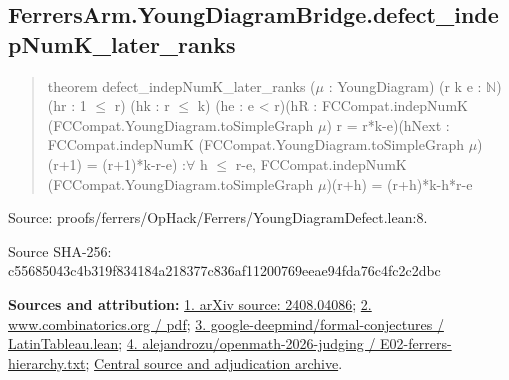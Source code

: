 \documentclass[11pt,a4paper]{article}
\begin{document}
\begin{samepage}
\subsection{FerrersArm.YoungDiagramBridge.defect\_indepNumK\_later\_ranks}
\begin{quote}\small\ttfamily theorem defect\_indepNumK\_later\_ranks (\ensuremath{\mu} : YoungDiagram) (r k e : \ensuremath{\mathbb{N}})\newline     (hr : 1 \ensuremath{\leq} r) (hk : r \ensuremath{\leq} k) (he : e < r)\newline     (hR : FCCompat.indepNumK (FCCompat.YoungDiagram.toSimpleGraph \ensuremath{\mu}) r = r*k-e)\newline     (hNext : FCCompat.indepNumK (FCCompat.YoungDiagram.toSimpleGraph \ensuremath{\mu})\newline       (r+1) = (r+1)*k-r-e) :\newline     \ensuremath{\forall} h \ensuremath{\leq} r-e, FCCompat.indepNumK (FCCompat.YoungDiagram.toSimpleGraph \ensuremath{\mu})\newline       (r+h) = (r+h)*k-h*r-e\end{quote}
{\small Source: proofs/ferrers/OpHack/Ferrers/YoungDiagramDefect.lean:8.\par}

{\small Source SHA-256: c55685043c4b319f834184a218377c836af11200769eeae94fda76c4fc2c2dbc\par}

{\small\textbf{Sources and attribution:} \href{https://arxiv.org/abs/2408.04086}{1. arXiv source: 2408.04086}; \href{https://www.combinatorics.org/ojs/index.php/eljc/article/download/v32i2p48/pdf/}{2. www.combinatorics.org / pdf}; \href{https://github.com/google-deepmind/formal-conjectures/blob/main/FormalConjectures/Paper/LatinTableau.lean}{3. google-deepmind/formal-conjectures / LatinTableau.lean}; \href{https://github.com/alejandrozu/openmath-2026-judging/blob/d0ed487f487fa7ec814ff705ab55249983fe8707/OpenMath-Judging/review/entries/E02-ferrers-hierarchy.txt}{4. alejandrozu/openmath-2026-judging / E02-ferrers-hierarchy.txt}; \href{https://github.com/alejandrozu/openmath-2026-judging}{Central source and adjudication archive}.\par}

\end{samepage}
\end{document}
